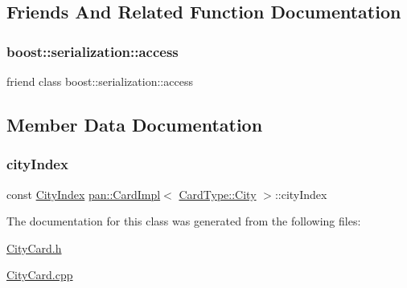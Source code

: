\subsection{Friends And Related Function Documentation}
\mbox{\label{classpan_1_1_card_impl_3_01_card_type_1_1_city_01_4_ac98d07dd8f7b70e16ccb9a01abf56b9c}} 
\subsubsection{\texorpdfstring{boost\+::serialization\+::access}{boost::serialization::access}}
{\footnotesize\ttfamily friend class boost\+::serialization\+::access\hspace{0.3cm}{\ttfamily [friend]}}



\subsection{Member Data Documentation}
\mbox{\label{classpan_1_1_card_impl_3_01_card_type_1_1_city_01_4_a793e709dc8efad7f513a1b92079ac09b}} 
\subsubsection{\texorpdfstring{city\+Index}{cityIndex}}
{\footnotesize\ttfamily const \hyperlink{namespacepan_afaed28aa6603153dcc062a028602d697}{City\+Index} \hyperlink{classpan_1_1_card_impl}{pan\+::\+Card\+Impl}$<$ \hyperlink{namespacepan_a1f7350bfd0421afeabe9fa95c16fa811a57d056ed0984166336b7879c2af3657f}{Card\+Type\+::\+City} $>$\+::city\+Index}



The documentation for this class was generated from the following files\+:\begin{DoxyCompactItemize}
\item 
\hyperlink{_city_card_8h}{City\+Card.\+h}\item 
\hyperlink{_city_card_8cpp}{City\+Card.\+cpp}\end{DoxyCompactItemize}
